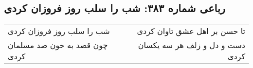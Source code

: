 \begin{center}
\section*{رباعی شماره ۳۸۳: شب را سلب روز فروزان کردی}
\label{sec:sh383}
\begin{longtable}{l p{0.5cm} r}
شب را سلب روز فروزان کردی
&&
تا حسن بر اهل عشق تاوان کردی
\\
چون قصد به خون صد مسلمان کردی
&&
دست و دل و زلف هر سه یکسان کردی
\\
\end{longtable}
\end{center}
